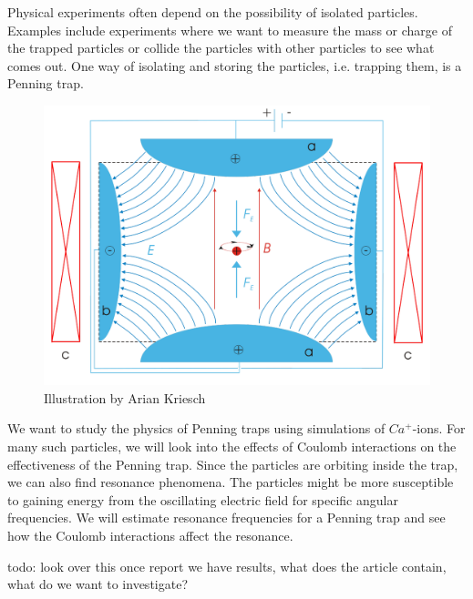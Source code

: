 Physical experiments often depend on the
possibility of isolated particles. Examples include experiments where we want to measure the mass or charge of the
trapped particles or collide the particles with
other particles to see what comes out. One way of isolating and
storing the particles, i.e. trapping them, is a Penning trap.

\begin{figure}
  \centering
  \includegraphics[scale=0.5]{figures/Penning_Trap.pdf}
  \caption{Illustration by Arian Kriesch}%
  \label{fig:penning}
\end{figure}

We want to study the physics of Penning traps using simulations of $Ca^+$-ions.
For many such particles, we will look into the effects of Coulomb interactions on the effectiveness
of the Penning trap. Since the particles are orbiting inside the trap, we can also find resonance
phenomena. The particles might be more susceptible to gaining energy
from the oscillating electric field for specific angular frequencies. We will estimate resonance frequencies for a Penning
trap and see how the Coulomb interactions affect the resonance.

todo: look over this once report we have results, what does the article contain, what do we want to
investigate?
